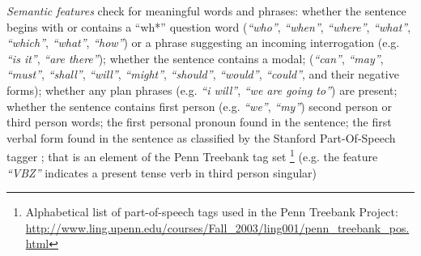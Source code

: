\textit{Semantic features} check for meaningful words and phrases:
%
whether the sentence begins with or contains a ``wh*'' question word 
(\textit{``who''}, \textit{``when''}, \textit{``where''}, \textit{``what''}, \textit{``which''}, \textit{``what''}, \textit{``how''}) 
or a phrase %
suggesting an incoming interrogation (e.g. \textit{``is it''}, \textit{``are there''}); %
whether the sentence contains a modal; 
(\textit{``can''}, \textit{``may''}, \textit{``must''}, \textit{``shall''}, \textit{``will''}, \textit{``might''}, \textit{``should''}, \textit{``would''}, \textit{``could''}, and their negative forms);
whether any plan phrases (e.g. \textit{``i will''}, \textit{``we are going to''}) are present;
whether the sentence contains first person (e.g. \textit{``we''}, \textit{``my''}) %
second person or third person words; %
the first personal pronoun found in the sentence;
the first verbal form found in the sentence as classified by the Stanford Part-Of-Speech tagger ; that is an element of the Penn Treebank tag set \footnote{Alphabetical list of part-of-speech tags used in the Penn Treebank Project: \url{http://www.ling.upenn.edu/courses/Fall_2003/ling001/penn_treebank_pos.html}} (e.g. the feature \textit{``VBZ''} indicates a present tense verb in third person singular)

